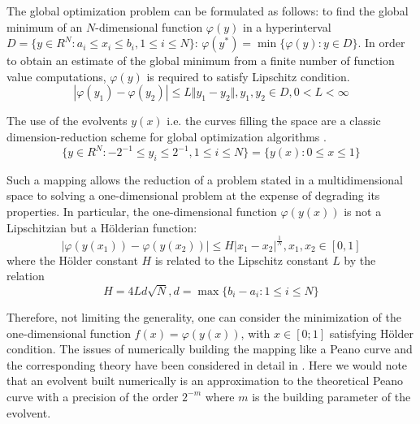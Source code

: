 \documentclass[procedia]{easychair}
\begin{document}
The global optimization problem can be formulated as follows: to find the global minimum of an
\(N\)-dimensional function \(\varphi(y)\) in a hyperinterval
\(D=\{y\in R^N:a_i\leqslant x_i\leqslant{b_i}, 1\leqslant{i}\leqslant{N}\}\): \(\varphi(y^*)=\min\{\varphi(y):y\in D\}\).
In order to obtain an estimate of the global minimum from a finite number of function value computations,
 \(\varphi(y)\) is required to satisfy Lipschitz condition.
\begin{displaymath}
\label{lip}
|\varphi(y_1)-\varphi(y_2)|\leqslant L\Vert y_1-y_2\Vert,y_1,y_2\in D,0<L<\infty
\end{displaymath}
\par
The use of the evolvents \(y(x)\) i.e. the curves filling the space are a classic
dimension-reduction scheme for global optimization algorithms \cite{strOptBook}.
\begin{displaymath}
\label{cube}
\lbrace y\in R^N:-2^{-1}\leqslant y_i\leqslant 2^{-1},1\leqslant i\leqslant N\rbrace=\{y(x):0\leqslant x\leqslant 1\}
\end{displaymath}
\par
Such a mapping allows the reduction of a problem stated in a multidimensional space
to solving a one-dimensional problem at the expense of degrading its properties.
In particular, the one-dimensional function \(\varphi(y(x))\) is not a Lipschitzian but a Hölderian function:
\begin{displaymath}
\label{holder}
|\varphi(y(x_1))-\varphi(y(x_2))|\leqslant H{|x_1-x_2|}^{\frac{1}{N}},x_1,x_2\in[0,1]
\end{displaymath}
where the Hölder constant \(H\) is related to the Lipschitz constant \(L\) by the relation
\begin{displaymath}
H=4Ld\sqrt{N},d=\max\{b_i-a_i:1\leqslant i\leqslant N\}
\end{displaymath}
\par
Therefore, not limiting the generality, one can consider the minimization of the
one-dimensional function \(f(x)=\varphi(y(x))\), with \(x\in[0;1]\) satisfying Hölder condition.
The issues of numerically building the mapping like a Peano curve and the corresponding
theory have been considered in detail in \cite{strOptBook}. Here we would note that an evolvent
built numerically is an approximation to the theoretical Peano curve with a precision
of the order \(2^{-m}\) where \(m\) is the building parameter of the evolvent.

\end{document}

